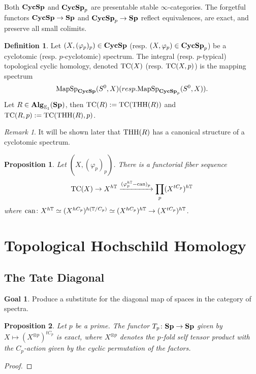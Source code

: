 \documentclass[letterpaper]{article}
\theoremstyle{definition}
\newtheorem{definition}{Definition}[section]
\newtheorem*{goal}{Goal}
\theoremstyle{remark}
\newtheorem{remark}{Remark}
\theoremstyle{plain}
\newtheorem{prop}{Proposition}
\begin{document}
Both $\mathbf{CycSp}$ and $\mathbf{CycSp}_p$ are presentable stable $\infty$-categories. The forgetful functors $\mathbf{CycSp}\rightarrow\mathbf{Sp}$ and $\mathbf{CycSp}_p\rightarrow\mathbf{Sp}$ reflect equivalences, are exact, and preserve all small colimits.

\begin{definition}
		Let $(X,(\varphi_p)_p)\in\mathbf{CycSp}$ (resp. $(X,\varphi_p)\in\mathbf{CycSp}_p$) be a cyclotomic (resp. $p$-cyclotomic) spectrum. The integral (resp. $p$-typical) topological cyclic homology, denoted $\textnormal{TC}(X)$ (resp. $\textnormal{TC}(X,p)$) is the mapping spectrum 
		$$\textnormal{MapSp}_{\mathbf{CycSp}}(S^0,X)(resp. \textnormal{MapSp}_{\mathbf{CycSp}_p}(S^0,X)).$$
		Let $R\in\mathbf{Alg}_{\mathbb{E}_1}(\mathbf{Sp})$, then $\textnormal{TC}(R):=\textnormal{TC}(\textnormal{THH}(R))$ and $\textnormal{TC}(R,p):=\textnormal{TC}(\textnormal{THH}(R),p)$.
\end{definition}

\begin{remark}
		It will be shown later that $\textnormal{THH}(R)$ has a canonical structure of a cyclotomic spectrum.
\end{remark}

\begin{prop}
		Let $(X,(\varphi_p)_p)$. There is a functorial fiber sequence
		$$\textnormal{TC}(X)\rightarrow X^{h\mathbb{T}}\xrightarrow{(\varphi_p^{h\mathbb{T}}-\textnormal{can})_p}\prod_p(X^{tC_p})^{h\mathbb{T}}$$
		where $\textnormal{can}\colon X^{h\mathbb{T}}\simeq(X^{hC_p})^{h(\mathbb{T}/C_p)}\simeq(X^{hC_p})^{h\mathbb{T}}\rightarrow(X^{tC_p})^{h\mathbb{T}}$.
\end{prop}

\section{Topological Hochschild Homology}

\subsection{The Tate Diagonal}

\begin{goal}
		Produce a substitute for the diagonal map of spaces in the category of spectra.
\end{goal}

\begin{prop}
		Let $p$ be a prime. The functor $T_p\colon\mathbf{Sp}\rightarrow\mathbf{Sp}$ given by $X\mapsto(X^{\otimes p})^{tC_p}$ is exact, where $X^{\otimes p}$ denotes the $p$-fold self tensor product with the $C_p$-action given by the cyclic permutation of the factors.
\end{prop}

\begin{proof}
		
\end{proof}
\end{document}
